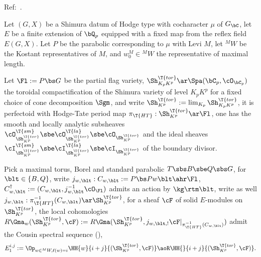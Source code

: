 \documentclass[article, a4paper, twoside]{universal}
\begin{document}
\confighead{}{}{}



Ref:~\cite{BCGP2025}.


\begin{stp}
    Let $(G,X)$ be a Shimura datum of Hodge type with cocharacter $\mu$ of $G_{\bC}$, let $E$ be a finite extension of $\bQ_p$ equipped with a fixed map from the reflex field $E(G,X)$. Let $P$ be the parabolic corresponding to $\mu$ with Levi $M$, let ${}^{M}W$ be the Kostant representatives of $M$, and $w_{0}^{M}\in{}^{M}W$ the representative of maximal length.

    Let $\Fl:=P\bs G$ be the partial flag variety, $\Sh_{K_{p}K^{p}}^{\T{tor}}\ar\Spa(\bC_{p},\cO_{\bC_{p}})$ the toroidal compactification of the Shimura variety of level $K_{p}K^{p}$ for a fixed choice of cone decomposition $\Sgm$, and write $\Sh_{K^{p}}^{\T{tor}}:=\lim_{K_{p}}\Sh_{K_{p}K^{p}}^{\T{tor}}$, it is perfectoid with Hodge-Tate period map $\pi_{\T{HT}}:\Sh_{K^{p}}^{\T{tor}}\ar\Fl$, one has the smooth and locally analytic subsheaves $\cO_{\Sh_{K^{p}}^{\T{tor}}}^{\T{sm}}\sbe\cO_{\Sh_{K^{p}}^{\T{tor}}}^{\T{la}}\sbe\cO_{\Sh_{K^{p}}^{\T{tor}}}$ and the ideal sheaves $\cI_{\Sh_{K^{p}}^{\T{tor}}}^{\T{sm}}\sbe\cI_{\Sh_{K^{p}}^{\T{tor}}}^{\T{la}}\sbe\cI_{\Sh_{K^{p}}^{\T{tor}}}$ of the boundary divisor.

    Pick a maximal torus, Borel and standard parabolic $T\sbs B\sbe Q\sbs G$, for $\blt\in\{B,Q\}$, write $j_{w,\blt}:C_{w,\blt}:=P\bs Pw\blt\ahr \Fl$, $C_{w,\blt}^{\dag}:=(C_{w,\blt},j_{w,\blt}^{-1}\cO_{\Fl})$ admits an action by $\kg\rtm \blt$, write as well $j_{w,\blt}:\pi_{\T{HT}}^{-1}(C_{w,\blt})\ar\Sh_{K^{p}}^{\T{tor}}$, for a sheaf $\cF$ of solid $E$-modules on $\Sh_{K^{p}}^{\T{tor}}$, the local cohomologies $R\Gma_{w}(\Sh_{K^{p}}^{\T{tor}},\cF):=R\Gma(\Sh_{K^{p}}^{\T{tor}},j_{w,\blt,!}\cF|_{\pi_{\T{HT}}^{-1}(C_{w,\blt})})$ admit the Cousin spectral sequence (\cite[4.6.13]{BCGP2025}),
    \[
        E_{1}^{i,j}:=\Op_{w\in{}^{M}W, \ell(w)=i}\HH{w}{i+j}{(\Sh_{K^{p}}^{\T{tor}},\cF)}\aoR\HH{}{i+j}{(\Sh_{K^{p}}^{\T{tor}},\cF)}.
    \]



\end{stp}
\end{document}
